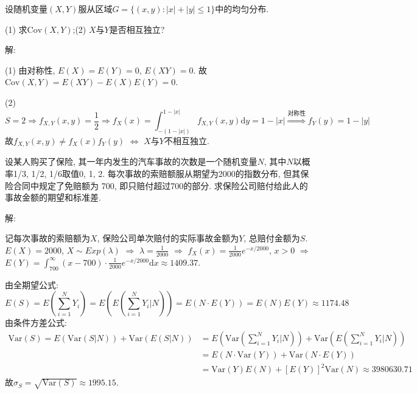 \documentclass[standard]{ExBook}
\renewenvironment{shaded}{%
  \def\FrameCommand{\fboxsep=\FrameSep \colorbox{shadecolor}}%
  \MakeFramed{\advance\hsize-\width \FrameRestore}%
}{%
  \endMakeFramed
}
\begin{document}
\begin{qitems}
\vspace{2.5cm-5em}

    \begin{bbox}
    \begin{shaded}
        \qitem
设随机变量$(X,Y)$服从区域$G=\{(x,y):|x|+|y|\leq 1\}$中的均匀分布.

(1) 求$\mathrm{Cov}(X,Y)$;\qquad (2) $X$与$Y$是否相互独立?
    \end{shaded}
    \end{bbox}

\vspace{\dimexpr2.5cm-5em\relax}

解: 

(1) 由对称性, $E(X)=E(Y)=0$, $E(XY)=0$. 故$\mathrm{Cov}(X,Y)=E(XY)-E(X)E(Y)=0$.

(2)
$$\displaystyle S=2 \Longrightarrow f_{X,Y}(x,y)=\frac{1}{2} \Longrightarrow f_{X}(x)=\int_{-(1-|x|)}^{1-|x|}f_{X,Y}(x,y)\mathrm{d}y=1-|x| \overset{\text{对称性}}{\Longrightarrow} f_{Y}(y)=1-|y|$$
故$f_{X,Y}(x,y)\neq f_{X}(x)f_{Y}(y)$ $\Longleftrightarrow$ $X$与$Y$不相互独立.

\vspace{2.5cm-5em}

    \begin{bbox}
    \begin{shaded}
        \qitem
设某人购买了保险, 其一年内发生的汽车事故的次数是一个随机变量$N$, 其中$N$以概率1/3, 1/2, 1/6取值0, 1, 2. 每次事故的索赔额服从期望为2000的指数分布, 但其保险合同中规定了免赔额为 700, 即只赔付超过700的部分. 求保险公司赔付给此人的事故金额的期望和标准差.
    \end{shaded}
    \end{bbox}

\vspace{\dimexpr2.5cm-5em\relax}

解: 

记每次事故的索赔额为$X$, 保险公司单次赔付的实际事故金额为$Y$, 总赔付金额为$S$. $E(X)=2000$, $X\sim Exp(\lambda)$ $\Longrightarrow$ $\lambda=\displaystyle\frac{1}{2000}$ $\Longrightarrow$ $f_{X}(x)=\displaystyle\frac{1}{2000}e^{-x/2000}$, $x>0$ $\Longrightarrow$ $\displaystyle E(Y)=\int_{700}^{\infty}(x-700)\cdot \frac{1}{2000}e^{-x/2000}\mathrm{d}x\approx1409.37$.

由全期望公式:
$$E(S)=E(\sum\limits_{i=1}^{N}Y_{i})=E(E(\sum\limits_{i=1}^{N}Y_{i}|N))=E(N\cdot E(Y))=E(N)E(Y)\approx 1174.48$$
由条件方差公式:
$$
    \begin{array}{ll}
\mathrm{Var}(S)=E(\mathrm{Var}(S|N))+\mathrm{Var}(E(S|N)) & =E(\mathrm{Var}(\sum\limits_{i=1}^{N}Y_{i}|N))+\mathrm{Var}(E(\sum\limits_{i=1}^{N}Y_{i}|N))\\
& =E(N \cdot \mathrm{Var}(Y))+\mathrm{Var}(N \cdot E(Y))\\
& =\mathrm{Var}(Y)E(N)+\left[E(Y)\right]^2 \mathrm{Var}(N)\approx3980630.71
    \end{array}
$$
故$\sigma_{S}=\sqrt{\mathrm{Var}(S)}\approx1995.15$.


\end{qitems}
\end{document}
